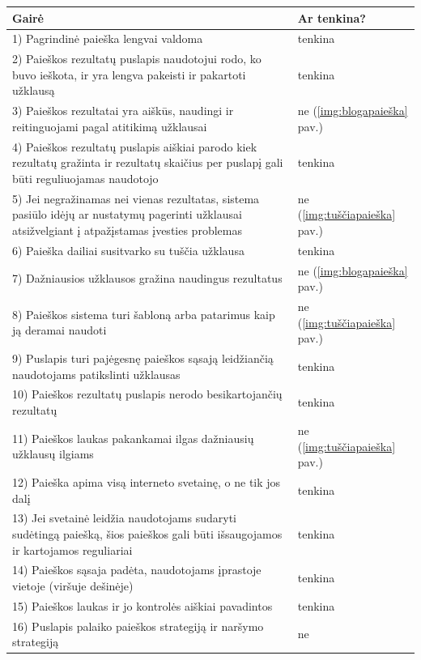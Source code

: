 \documentclass{VUMIFPSkursinis}
\begin{document}
\begin{center}
\begin{tabular}{ |p{}|p{2cm}| } 
 \hline
	Gairė & Ar tenkina? \\ \hline
	1) Pagrindinė paieška lengvai valdoma & tenkina \\ \hline
	2) Paieškos rezultatų puslapis naudotojui rodo, ko buvo ieškota, ir yra lengva pakeisti ir pakartoti užklausą & tenkina \\ \hline
	3) Paieškos rezultatai yra aiškūs, naudingi ir reitinguojami pagal atitikimą užklausai & ne (\ref{img:blogapaieška} pav.) \\ \hline
	4) Paieškos rezultatų puslapis aiškiai parodo kiek rezultatų gražinta ir rezultatų skaičius per puslapį gali būti reguliuojamas naudotojo & tenkina \\ \hline
	5) Jei negražinamas nei vienas rezultatas, sistema pasiūlo idėjų ar nustatymų pagerinti užklausai atsižvelgiant į atpažįstamas įvesties problemas & ne (\ref{img:tuščiapaieška} pav.) \\ \hline
	6) Paieška dailiai susitvarko su tuščia užklausa & tenkina \\ \hline
	7) Dažniausios užklausos gražina naudingus rezultatus & ne (\ref{img:blogapaieška} pav.) \\ \hline
	8) Paieškos sistema turi šabloną arba patarimus kaip ją deramai naudoti & ne (\ref{img:tuščiapaieška} pav.) \\ \hline
	9) Puslapis turi pajėgesnę paieškos sąsają leidžiančią naudotojams patikslinti užklausas & tenkina \\ \hline
	10) Paieškos rezultatų puslapis nerodo besikartojančių rezultatų & tenkina \\ \hline
	11) Paieškos laukas pakankamai ilgas dažniausių užklausų ilgiams & ne (\ref{img:tuščiapaieška} pav.) \\ \hline
	12) Paieška apima visą interneto svetainę, o ne tik jos dalį & tenkina \\ \hline
	13) Jei svetainė leidžia naudotojams sudaryti sudėtingą paiešką, šios paieškos gali būti išsaugojamos ir kartojamos reguliariai & tenkina \\ \hline
	14) Paieškos sąsaja padėta, naudotojams įprastoje vietoje (viršuje dešinėje) & tenkina \\ \hline
	15) Paieškos laukas ir jo kontrolės aiškiai pavadintos & tenkina \\ \hline
	16) Puslapis palaiko paieškos strategiją ir naršymo strategiją & ne \\ \hline

\end{tabular}
\end{center}
\end{document}
